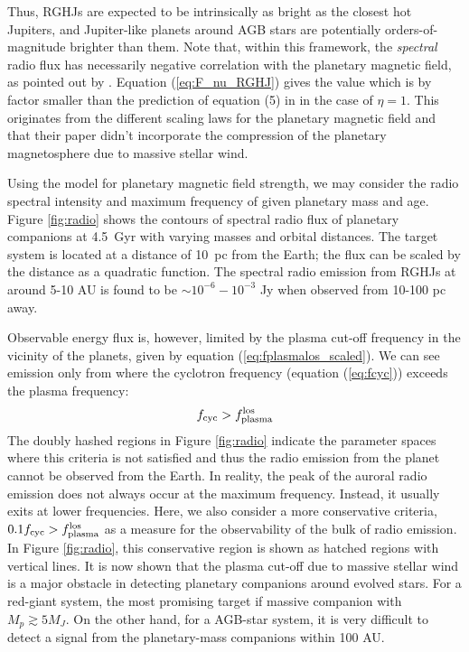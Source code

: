 \documentclass[iop,numberedappendix,apj]{emulateapj}
\def\memoYF#1{\color{red}$[${\bf #1}$]$ \color{black}}
\begin{document}
Thus, RGHJs are expected to be intrinsically as bright as the closest hot Jupiters, and Jupiter-like planets around AGB stars are potentially orders-of-magnitude brighter than them. 
Note that, within this framework, the {\it spectral} radio flux has necessarily negative correlation with the planetary magnetic field, as pointed out by \citet{griesmeier2005}. 
Equation (\ref{eq:F_nu_RGHJ}) gives the value which is by factor smaller than the prediction of equation (5) in \citet{ignace2010} in the case of $\eta = 1$. This originates from the different scaling laws for the planetary magnetic field and that their paper didn't incorporate the compression of the planetary magnetosphere due to massive stellar wind. 

Using the model for planetary magnetic field strength, we may consider the  radio spectral intensity and maximum frequency of given planetary mass and age. 
Figure \ref{fig:radio} shows the contours of spectral radio flux of planetary companions at 4.5~Gyr with varying masses and orbital distances. 
The target system is located at a distance of 10~pc from the Earth; the flux can be scaled by the distance as a quadratic function. 
The spectral radio emission from RGHJs at around 5-10 AU is found to be $\sim 10^{-6}-10^{-3}$ Jy when observed from 10-100 pc away. 

Observable energy flux is, however, limited by the plasma cut-off frequency in the vicinity of the planets, given by equation (\ref{eq:fplasmalos_scaled}).
We can see emission only from where the cyclotron frequency (equation (\ref{eq:fcyc})) exceeds the plasma frequency:
\begin{equation}
\label{eq:fcyc>fplasma} f_{\rm cyc} > f_{\rm plasma}^{\rm los}
\end{equation} 
The doubly hashed regions in Figure \ref{fig:radio} indicate the parameter spaces where this criteria is not satisfied and thus the radio emission from the planet cannot be observed from the Earth. 
In reality, the peak of the auroral radio emission does not always occur at the maximum frequency. Instead, it usually exits at lower frequencies. Here, we also consider a more conservative criteria, $0.1 f_{\rm cyc} > f_{\rm plasma}^{\rm los}$ as a measure for the observability of the bulk of radio emission. In Figure \ref{fig:radio}, this conservative region is shown as hatched regions with vertical lines. 
It is now shown that the plasma cut-off due to massive stellar wind is a major obstacle in detecting planetary companions around evolved stars. For a red-giant system, the most promising target if massive companion with $M_p \gtrsim 5M_J$. On the other hand, for a AGB-star system, it is very difficult to detect a signal from the planetary-mass companions within 100 AU. 
\end{document}
